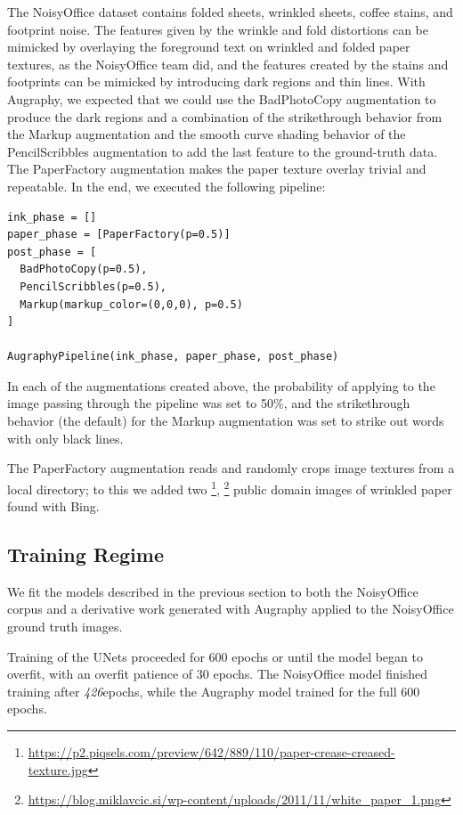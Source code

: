 \documentclass[runningheads]{llncs}
\newcommand{\numNoisyOfficeUNetEpochs}{\emph{426}}
\begin{document}
The NoisyOffice dataset contains folded sheets, wrinkled sheets, coffee stains, and footprint noise.
The features given by the wrinkle and fold distortions can be mimicked by overlaying the foreground text on wrinkled and folded paper textures, as the NoisyOffice team did, and the features created by the stains and footprints can be mimicked by introducing dark regions and thin lines.
With Augraphy, we expected that we could use the BadPhotoCopy augmentation to produce the dark regions and a combination of the strikethrough behavior from the Markup augmentation and the smooth curve shading behavior of the PencilScribbles augmentation to add the last feature to the ground-truth data.
The PaperFactory augmentation makes the paper texture overlay trivial and repeatable. In the end, we executed the following pipeline:

\begin{lstlisting}
ink_phase = []
paper_phase = [PaperFactory(p=0.5)]
post_phase = [
  BadPhotoCopy(p=0.5),
  PencilScribbles(p=0.5),
  Markup(markup_color=(0,0,0), p=0.5)
]

AugraphyPipeline(ink_phase, paper_phase, post_phase)
\end{lstlisting}

In each of the augmentations created above, the probability of applying to the image passing through the pipeline was set to 50\%, and the strikethrough behavior (the default) for the Markup augmentation was set to strike out words with only black lines.

The PaperFactory augmentation reads and randomly crops image textures from a local directory; to this we added two \footnote{\url{https://p2.piqsels.com/preview/642/889/110/paper-crease-creased-texture.jpg}}, \footnote{\url{https://blog.miklavcic.si/wp-content/uploads/2011/11/white_paper_1.png}} public domain images of wrinkled paper found with Bing.

\subsection{Training Regime}
We fit the models described in the previous section to both the NoisyOffice corpus and a derivative work generated with Augraphy applied to the NoisyOffice ground truth images.

Training of the UNets proceeded for 600 epochs or until the model began to overfit, with an overfit patience of 30 epochs.
The NoisyOffice model finished training after \numNoisyOfficeUNetEpochs epochs, while the Augraphy model trained for the full 600 epochs.
\end{document}
